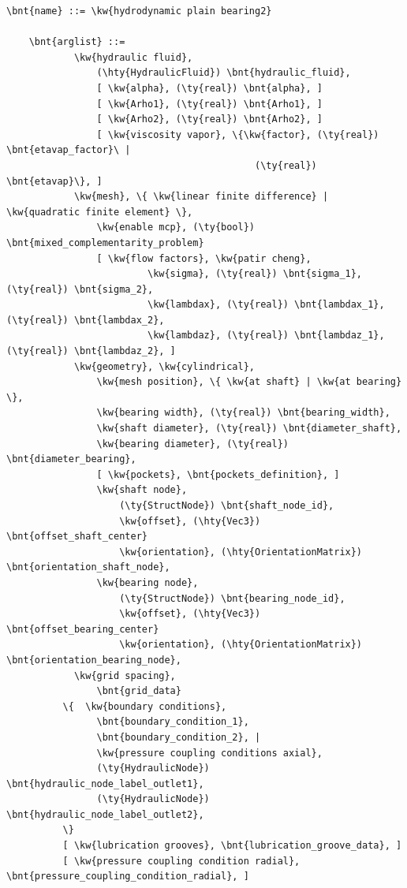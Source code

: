 \begin{Verbatim}[commandchars=\\\{\}]
    \bnt{name} ::= \kw{hydrodynamic plain bearing2}

    \bnt{arglist} ::=
            \kw{hydraulic fluid},
                (\hty{HydraulicFluid}) \bnt{hydraulic_fluid},
                [ \kw{alpha}, (\ty{real}) \bnt{alpha}, ]
                [ \kw{Arho1}, (\ty{real}) \bnt{Arho1}, ]
                [ \kw{Arho2}, (\ty{real}) \bnt{Arho2}, ]
                [ \kw{viscosity vapor}, \{\kw{factor}, (\ty{real}) \bnt{etavap_factor}\ |
                                            (\ty{real}) \bnt{etavap}\}, ]
            \kw{mesh}, \{ \kw{linear finite difference} | \kw{quadratic finite element} \},
                \kw{enable mcp}, (\ty{bool}) \bnt{mixed_complementarity_problem}
                [ \kw{flow factors}, \kw{patir cheng},
                         \kw{sigma}, (\ty{real}) \bnt{sigma_1}, (\ty{real}) \bnt{sigma_2},
                         \kw{lambdax}, (\ty{real}) \bnt{lambdax_1}, (\ty{real}) \bnt{lambdax_2},
                         \kw{lambdaz}, (\ty{real}) \bnt{lambdaz_1}, (\ty{real}) \bnt{lambdaz_2}, ]
            \kw{geometry}, \kw{cylindrical},
                \kw{mesh position}, \{ \kw{at shaft} | \kw{at bearing} \},
                \kw{bearing width}, (\ty{real}) \bnt{bearing_width},
                \kw{shaft diameter}, (\ty{real}) \bnt{diameter_shaft},
                \kw{bearing diameter}, (\ty{real}) \bnt{diameter_bearing},
                [ \kw{pockets}, \bnt{pockets_definition}, ]
                \kw{shaft node},
                    (\ty{StructNode}) \bnt{shaft_node_id},
                    \kw{offset}, (\hty{Vec3}) \bnt{offset_shaft_center}
                    \kw{orientation}, (\hty{OrientationMatrix}) \bnt{orientation_shaft_node},
                \kw{bearing node},
                    (\ty{StructNode}) \bnt{bearing_node_id},
                    \kw{offset}, (\hty{Vec3}) \bnt{offset_bearing_center}
                    \kw{orientation}, (\hty{OrientationMatrix}) \bnt{orientation_bearing_node},
            \kw{grid spacing},
                \bnt{grid_data}
          \{  \kw{boundary conditions},
                \bnt{boundary_condition_1},
                \bnt{boundary_condition_2}, |
                \kw{pressure coupling conditions axial},
                (\ty{HydraulicNode}) \bnt{hydraulic_node_label_outlet1},
                (\ty{HydraulicNode}) \bnt{hydraulic_node_label_outlet2},
          \}
          [ \kw{lubrication grooves}, \bnt{lubrication_groove_data}, ]
          [ \kw{pressure coupling condition radial}, \bnt{pressure_coupling_condition_radial}, ]

\end{Verbatim}
